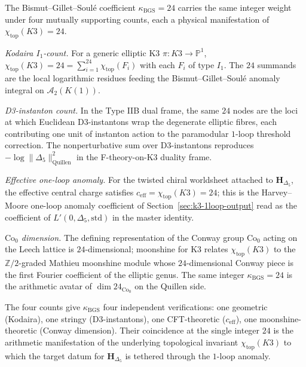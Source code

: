 \begin{remark}[Physical interpretation \texorpdfstring{$\kappa_{\mathrm{BGS}} = 24$}{kappa-BGS = 24}]
\label{rem:k3-kappa-BGS-physical}
The Bismut--Gillet--Soul\'e coefficient $\kappa_{\mathrm{BGS}} = 24$ carries
the same integer weight under four mutually supporting counts, each a physical
manifestation of $\chi_{\mathrm{top}}(K3) = 24$.

\emph{Kodaira $I_1$-count.} For a generic elliptic K3 $\pi\colon K3 \to
\mathbb{P}^1$, $\chi_{\mathrm{top}}(K3) = 24 = \sum_{i=1}^{24}
\chi_{\mathrm{top}}(F_i)$ with each $F_i$ of type $I_1$. The $24$ summands are
the local logarithmic residues feeding the Bismut--Gillet--Soul\'e anomaly
integral on $\mathcal{A}_2(K(1))$.

\emph{D3-instanton count.} In the Type IIB dual frame, the same $24$ nodes are
the loci at which Euclidean D$3$-instantons wrap the degenerate elliptic
fibres, each contributing one unit of instanton action to the paramodular
$1$-loop threshold correction. The nonperturbative sum over D$3$-instantons
reproduces $-\log\|\Delta_5\|^2_{\mathrm{Quillen}}$ in the F-theory-on-K3
duality frame.

\emph{Effective one-loop anomaly.} For the twisted chiral worldsheet attached
to $\mathbf{H}_{\Delta_5}$, the effective central charge satisfies
$c_{\mathrm{eff}} = \chi_{\mathrm{top}}(K3) = 24$; this is the Harvey--Moore
one-loop anomaly coefficient of Section~\ref{sec:k3-1loop-output} read as the
coefficient of $L'(0,\Delta_5,\mathrm{std})$ in the master identity.

\emph{$\mathrm{Co}_0$ dimension.} The defining representation of the Conway
group $\mathrm{Co}_0$ acting on the Leech lattice is $24$-dimensional;
moonshine for K3 relates $\chi_{\mathrm{top}}(K3)$ to the $\mathbb{Z}/2$-graded
Mathieu moonshine module whose $24$-dimensional Conway piece is the first
Fourier coefficient of the elliptic genus. The same integer
$\kappa_{\mathrm{BGS}} = 24$ is the arithmetic avatar of
$\dim 24_{\mathrm{Co}_0}$ on the Quillen side.

The four counts give $\kappa_{\mathrm{BGS}}$ four independent verifications:
one geometric (Kodaira), one stringy (D$3$-instantons), one CFT-theoretic
($c_{\mathrm{eff}}$), one moonshine-theoretic (Conway dimension). Their
coincidence at the single integer $24$ is the arithmetic manifestation of the
underlying topological invariant $\chi_{\mathrm{top}}(K3)$ to which the
target datum for $\mathbf{H}_{\Delta_5}$ is tethered through the
$1$-loop anomaly.
\end{remark}

